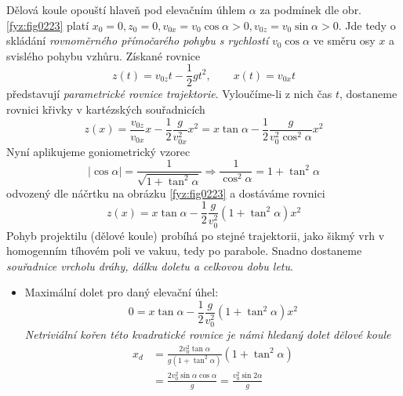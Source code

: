 \begin{example}
  Dělová koule opouští hlaveň pod elevačním úhlem $\alpha$ za podmínek dle obr. 
  \ref{fyz:fig0223} platí $x_0=0, z_0=0, v_{0x}=v_0\cos\alpha>0, v_{0z}=v_0\sin\alpha>0$. Jde 
  tedy o skládání \emph{rovnoměrného přímočarého pohybu s rychlostí} $v_0\cos\alpha$ ve směru osy 
  $x$ a svislého pohybu vzhůru. Získané rovnice
  \begin{equation}\label{mech:eq_delo_rce_pohybu}
    z(t)=v_{0z}t-\frac{1}{2}gt^2, \qquad x(t)=v_{0x}t
  \end{equation}
  představují \emph{parametrické rovnice trajektorie}. Vyloučíme-li z nich čas $t$, dostaneme 
  rovnici křivky v kartézských souřadnicích
  \begin{equation}\label{mech:eq_delo_vakuum_param_rce}
    z(x)=  \frac{v_{0z}}{v_{0x}}x-\frac{1}{2}\frac{g}{v_{0x}^2}x^2
        = x\tan\alpha-\frac{1}{2}\frac{g}{v_0^2\cos^2\alpha}x^2
  \end{equation}
  Nyní aplikujeme goniometrický vzorec
  \begin{equation*}
    \vert\cos\alpha\rvert = \frac{1}{\sqrt{1+\tan^2\alpha}}\Rightarrow \frac{1}{\cos^2\alpha} 
                          = 1+\tan^2\alpha
  \end{equation*}
  odvozený dle náčrtku na obrázku \ref{fyz:fig0223} a dostáváme rovnici
  \begin{equation}\label{mech_eq_example_vysledna_rce}
    z(x)=x\tan\alpha-\frac{1}{2}\frac{g}{v_0^2}(1+\tan^2\alpha)x^2
  \end{equation}
  Pohyb projektilu (dělové koule) probíhá po stejné trajektorii, jako šikmý vrh v homogenním 
  tíhovém poli ve vakuu, tedy po parabole. Snadno dostaneme \emph{souřadnice vrcholu dráhy, dálku 
  doletu a celkovou dobu letu}.

  \begin{itemize}
    \item Maximální dolet pro daný elevační úhel:
      \begin{equation}\label{mech:eq_elevacni_uhel_1}
        0=x\tan\alpha-\frac{1}{2}\frac{g}{v_0^2}(1+\tan^2\alpha)x^2
      \end{equation}
      \emph{Netriviální kořen této kvadratické rovnice je námi hledaný dolet dělové koule}
      \begin{align}  %
        x_d &=\frac{2v_0^2\tan\alpha}{g(1+\tan^2\alpha)}(1+\tan^2\alpha)        \nonumber \\
            &=\frac{2v_0^2\sin\alpha\cos\alpha}{g}=\frac{v_0^2\sin{2\alpha}}{g} \label{fyz:eq235}
      \end{align}


\end{itemize}
\end{example}
